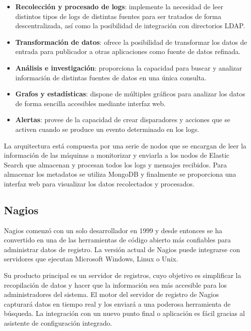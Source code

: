 \begin{itemize}
\item \textbf{Recolección y procesado de logs}: implemente la necesidad de leer distintos tipos de logs de distintas fuentes para ser tratados de forma descentralizada, así como la posibilidad de integración con directorios LDAP.

\item \textbf{Transformación de datos}: ofrece la posibilidad de transformar los datos de entrada para publicador a otras aplicaciones como fuente de datos refinada.

\item \textbf{Análisis e investigación}: proporciona la capacidad para buscar y analizar información  de distintas fuentes de datos en una única consulta.

\item \textbf{Grafos y estadísticas}: dispone de múltiples gráficos para analizar los datos de forma sencilla accesibles mediante interfaz web.

\item \textbf{Alertas}: provee de la capacidad de crear disparadores y acciones que se activen cuando se produce un evento determinado en los logs. 
\end{itemize}

La arquitectura está compuesta por una serie de nodos que se encargan de leer la información de las máquinas a monitorizar y enviarla a los nodos de Elastic Search que almacenan y procesan todos los logs y mensajes recibidos. Para almacenar los metadatos se utiliza MongoDB y finalmente se proporciona una interfaz web para visualizar los datos recolectados y procesados.


\subsection{Nagios}

Nagios comenzó con un solo desarrollador en 1999 y desde entonces se ha convertido en una de las herramientas de código abierto más confiables para administrar datos de registro. La versión actual de Nagios puede integrarse con servidores que ejecutan Microsoft Windows, Linux o Unix.

Su producto principal es un servidor de registros, cuyo objetivo es simplificar la recopilación de datos y hacer que la información sea más accesible para los administradores del sistema. El motor del servidor de registro de Nagios capturará datos en tiempo real y los enviará a una poderosa herramienta de búsqueda. La integración con un nuevo punto final o aplicación es fácil gracias al asistente de configuración integrado.

